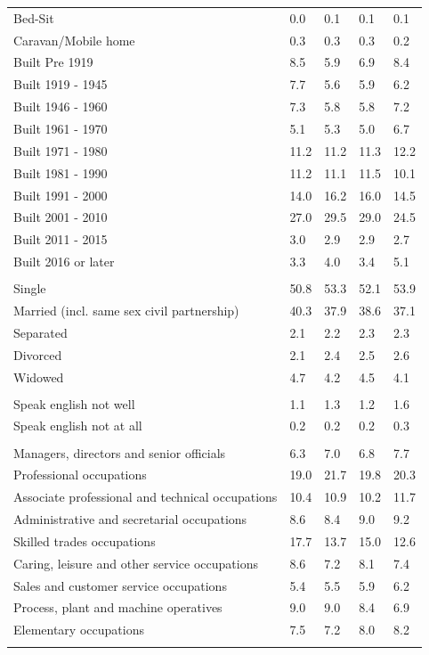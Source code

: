 \documentclass{article}
\begin{document}
\begin{table}[h]
\begin{tabular}{KTTTT}
Bed-Sit & 0.0& 0.1& 0.1& 0.1\\
Caravan/Mobile home & 0.3& 0.3& 0.3& 0.2\\
    \hline
Built Pre 1919 & 8.5& 5.9& 6.9& 8.4\\
Built 1919 - 1945 & 7.7& 5.6& 5.9& 6.2\\
Built  1946 - 1960 & 7.3& 5.8& 5.8& 7.2\\
Built  1961 - 1970 & 5.1& 5.3& 5.0& 6.7\\
Built  1971 - 1980 & 11.2& 11.2& 11.3& 12.2\\
Built  1981 - 1990 & 11.2& 11.1& 11.5& 10.1\\
Built  1991 - 2000 & 14.0& 16.2& 16.0& 14.5\\
Built  2001 - 2010 & 27.0& 29.5& 29.0& 24.5\\
Built  2011 - 2015 & 3.0& 2.9& 2.9& 2.7\\
Built  2016 or later & 3.3& 4.0& 3.4& 5.1\\
\hline
    \\
    \hline
Single & 50.8& 53.3& 52.1& 53.9\\
Married (incl. same sex civil partnership) & 40.3& 37.9& 38.6& 37.1\\
Separated  & 2.1& 2.2& 2.3& 2.3\\
Divorced  & 2.1& 2.4& 2.5& 2.6\\
Widowed & 4.7& 4.2& 4.5& 4.1\\
\hline
    \\ 
    \hline
Speak english not well & 1.1& 1.3& 1.2& 1.6\\
Speak english not at all & 0.2& 0.2& 0.2& 0.3\\
\hline
    \\
    \hline
Managers, directors and senior officials & 6.3& 7.0& 6.8& 7.7\\
Professional occupations & 19.0& 21.7& 19.8& 20.3\\
Associate professional and technical occupations & 10.4& 10.9& 10.2& 11.7\\
Administrative and secretarial occupations & 8.6& 8.4& 9.0& 9.2\\
Skilled trades occupations & 17.7& 13.7& 15.0& 12.6\\
Caring, leisure and other service occupations & 8.6& 7.2& 8.1& 7.4\\
Sales and customer service occupations & 5.4& 5.5& 5.9& 6.2\\
Process, plant and machine operatives & 9.0& 9.0& 8.4& 6.9\\
Elementary occupations & 7.5& 7.2& 8.0& 8.2\\
\hline
\end{tabular}
\end{table}
\end{document}
